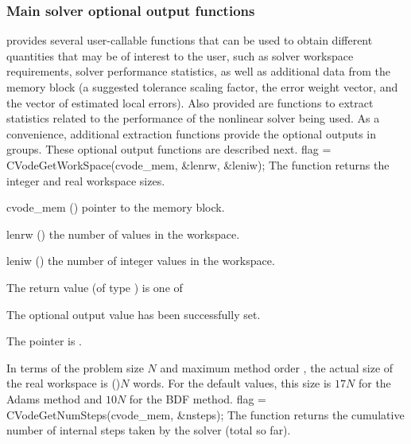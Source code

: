 \subsubsection{Main solver optional output functions}
{\cvode} provides several user-callable functions that can be used to obtain
different quantities that may be of interest to the user, such as solver workspace
requirements, solver performance statistics, as well as additional data from
the {\cvode} memory block (a suggested tolerance scaling factor, the error weight
vector, and the vector of estimated local errors). Also provided are functions to
extract statistics related to the performance of the {\cvode} nonlinear solver
being used. As a convenience, additional extraction functions provide the optional 
outputs in groups.
These optional output functions are described next.
{
  flag = CVodeGetWorkSpace(cvode\_mem, \&lenrw, \&leniw);
}
{
  The function  returns the
  {\cvode} integer and real workspace sizes.
}
{
  \begin{args}
  \item[cvode\_mem] ()
    pointer to the {\cvode} memory block.
  \item[lenrw] ()
    the number of  values in the {\cvode} workspace.
  \item[leniw] ()
    the number of integer values in the {\cvode} workspace.
  \end{args}
}
{
  The return value  (of type ) is one of
  \begin{args}
  \item[\Id{CV\_SUCCESS}] 
    The optional output value has been successfully set.
  \item[\Id{CV\_MEM\_NULL}]
    The  pointer is .
  \end{args}
}
{
  In terms of the problem size $N$ and maximum method order ,
  the actual size of the real workspace is ()$N$ 
  words.  For the default values, this size is $17 N$ for the Adams method
  and $10 N$ for the BDF method.
}
{
  flag = CVodeGetNumSteps(cvode\_mem, \&nsteps);
}
{
  The function  returns the cumulative number of internal 
  steps taken by the solver (total so far).
}

